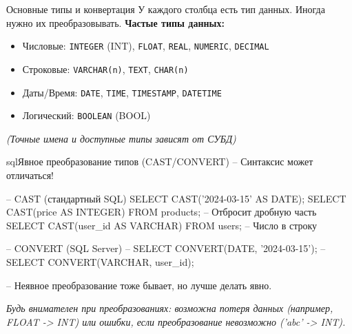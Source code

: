 \begin{myblock}{Основные типы и конвертация}
    У каждого столбца есть тип данных. Иногда нужно их преобразовывать.
    \textbf{Частые типы данных:}
    \begin{itemize}
        \item Числовые: \texttt{INTEGER} (INT), \texttt{FLOAT}, \texttt{REAL}, \texttt{NUMERIC}, \texttt{DECIMAL}
        \item Строковые: \texttt{VARCHAR(n)}, \texttt{TEXT}, \texttt{CHAR(n)}
        \item Даты/Время: \texttt{DATE}, \texttt{TIME}, \texttt{TIMESTAMP}, \texttt{DATETIME}
        \item Логический: \texttt{BOOLEAN} (BOOL)
    \end{itemize}
    \textit{(Точные имена и доступные типы зависят от СУБД)}

    \begin{codebox}{sql}{Явное преобразование типов (CAST/CONVERT)}
    -- Синтаксис может отличаться!

    -- CAST (стандартный SQL)
    SELECT CAST('2024-03-15' AS DATE);
    SELECT CAST(price AS INTEGER) FROM products; -- Отбросит дробную часть
    SELECT CAST(user_id AS VARCHAR) FROM users; -- Число в строку

    -- CONVERT (SQL Server)
    -- SELECT CONVERT(DATE, '2024-03-15');
    -- SELECT CONVERT(VARCHAR, user_id);

    -- Неявное преобразование тоже бывает, но лучше делать явно.
    \end{codebox}
    \textit{Будь внимателен при преобразованиях: возможна потеря данных (например, FLOAT -> INT) или ошибки, если преобразование невозможно ('abc' -> INT).}
\end{myblock}

\newpage %
